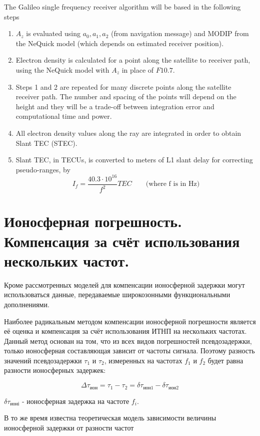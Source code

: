 \documentclass[14pt,a4paper,oneside]{extarticle}
\begin{document}
The Galileo single frequency receiver algorithm will be based in the following steps
\begin{enumerate}
    \item $A_z$ is evaluated using $\displaystyle{ a_0 }, \displaystyle{ a_1 },\displaystyle{ a_2 }$ (from navigation message) and MODIP from the NeQuick model (which depends on estimated receiver position).
    \item Electron density is calculated for a point along the satellite to receiver path, using the NeQuick model with $A_z$ in place of $\displaystyle{ F10.7 }$.
    \item Steps 1 and 2 are repeated for many discrete points along the satellite receiver path. The number and spacing of the points will depend on the height and they will be a trade-off between integration error and computational time and power.
    \item All electron density values along the ray are integrated in order to obtain Slant TEC (STEC).
    \item Slant TEC, in TECUs, is converted to meters of L1 slant delay for correcting pseudo-ranges, by \[\displaystyle{ 
        I_f = \frac{40.3\cdot 10^{16}}{f^2}TEC \qquad\mbox{(where f is in Hz)} }\]
\end{enumerate}

\section{Ионосферная погрешность. Компенсация за счёт использования нескольких частот.}

Кроме рассмотренных моделей для компенсации ионосферной задержки могут использоваться данные, передаваемые широкозонными функциональными дополнениями.

Наиболее радикальным методом компенсации ионосферной погрешности является её оценка и компенсация за счёт использования ИТНП на нескольких частотах. Данный метод основан на том, что из всех видов погрешностей псевдозадержки, только ионосферная составляющая зависит от частоты сигнала. Поэтому разность значений псевдозадержки $\tau_1$ и $\tau_2$, измеренных на частотах $f_1$ и $f_2$ будет равна разности ионосферных задержек:

\[\Delta\tau_{\text{ион}} = \tau _ { 1 }-\tau_{2}=\delta\tau_{\text{ион}1}-\delta\tau_{\text{ион}2}\]

$\delta\tau_{\text{ионі}}$ - ионосферная задержка на частоте $f_i$.

В то же время известна теоретическая модель зависимости величины ионосферной задержки от разности частот
\end{document}
